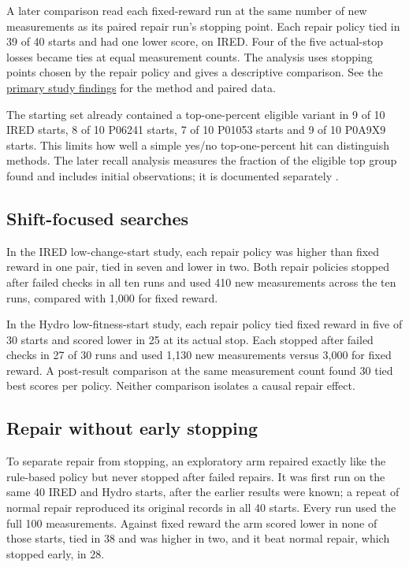 \documentclass[11pt,a4paper]{article}
\begin{document}
A later comparison read each fixed-reward run at the same number of new measurements as its paired repair run's stopping point. Each repair policy tied in 39 of 40 starts and had one lower score, on IRED. Four of the five actual-stop losses became ties at equal measurement counts. The analysis uses stopping points chosen by the repair policy and gives a descriptive comparison. See the \href{../docs/studies/multiprotein/four_protein_findings.md}{primary study findings} for the method and paired data.

The starting set already contained a top-one-percent eligible variant in 9 of 10 IRED starts, 8 of 10 P06241 starts, 7 of 10 P01053 starts and 9 of 10 P0A9X9 starts. This limits how well a simple yes/no top-one-percent hit can distinguish methods. The later recall analysis measures the fraction of the eligible top group found and includes initial observations; it is documented separately \cite{metrics}.

\subsection{Shift-focused searches}
In the IRED low-change-start study, each repair policy was higher than fixed reward in one pair, tied in seven and lower in two. Both repair policies stopped after failed checks in all ten runs and used 410 new measurements across the ten runs, compared with 1,000 for fixed reward.

In the Hydro low-fitness-start study, each repair policy tied fixed reward in five of 30 starts and scored lower in 25 at its actual stop. Each stopped after failed checks in 27 of 30 runs and used 1,130 new measurements versus 3,000 for fixed reward. A post-result comparison at the same measurement count found 30 tied best scores per policy. Neither comparison isolates a causal repair effect.

\subsection{Repair without early stopping}
To separate repair from stopping, an exploratory arm repaired exactly like the rule-based policy but never stopped after failed repairs. It was first run on the same 40 IRED and Hydro starts, after the earlier results were known; a repeat of normal repair reproduced its original records in all 40 starts. Every run used the full 100 measurements. Against fixed reward the arm scored lower in none of those starts, tied in 38 and was higher in two, and it beat normal repair, which stopped early, in 28.
\end{document}
